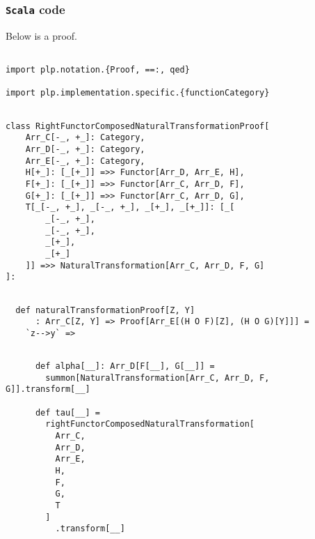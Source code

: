 \documentclass[11pt]{article}
\newcommand{\code}{\subsubsection{{\tt Scala} code}\begingroup\rm \vspace{12pt}}
\begin{document}
\code
Below is a proof.

\vspace{6pt}
\begin{mdframed}[backgroundcolor=lightgray!20] 
\begin{lstlisting}

import plp.notation.{Proof, ==:, qed}

import plp.implementation.specific.{functionCategory}
\end{lstlisting}
\end{mdframed}
\vspace{6pt}
\begin{mdframed}[backgroundcolor=lightgray!20] 
\begin{lstlisting}

class RightFunctorComposedNaturalTransformationProof[
    Arr_C[-_, +_]: Category,
    Arr_D[-_, +_]: Category,
    Arr_E[-_, +_]: Category,
    H[+_]: [_[+_]] =>> Functor[Arr_D, Arr_E, H],
    F[+_]: [_[+_]] =>> Functor[Arr_C, Arr_D, F],
    G[+_]: [_[+_]] =>> Functor[Arr_C, Arr_D, G],
    T[_[-_, +_], _[-_, +_], _[+_], _[+_]]: [_[
        _[-_, +_],
        _[-_, +_],
        _[+_],
        _[+_]
    ]] =>> NaturalTransformation[Arr_C, Arr_D, F, G]
]:
\end{lstlisting}
\end{mdframed}
\vspace{6pt}
\begin{mdframed}[backgroundcolor=lightgray!20] 
\begin{lstlisting}
  
  def naturalTransformationProof[Z, Y]
      : Arr_C[Z, Y] => Proof[Arr_E[(H O F)[Z], (H O G)[Y]]] =
    `z-->y` =>
\end{lstlisting}
\end{mdframed}
\vspace{6pt}
\begin{mdframed}[backgroundcolor=lightgray!20] 
\begin{lstlisting}

      def alpha[__]: Arr_D[F[__], G[__]] =
        summon[NaturalTransformation[Arr_C, Arr_D, F, G]].transform[__]

      def tau[__] =
        rightFunctorComposedNaturalTransformation[
          Arr_C,
          Arr_D,
          Arr_E,
          H,
          F,
          G,
          T
        ]
          .transform[__]
\end{lstlisting}
\end{mdframed}
\vspace{6pt}
\end{document}
